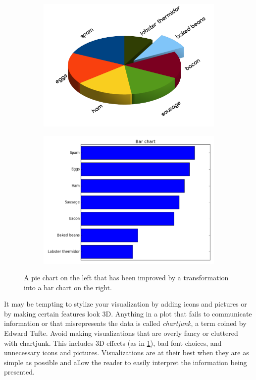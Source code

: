 \begin{figure} %
\centering
\begin{subfigure}{.45\textwidth}
\centering
\includegraphics[width=\textwidth]{bad_pie_chart.png}
\end{subfigure}
\begin{subfigure}{.45\textwidth}
\centering
\includegraphics[width=\textwidth]{bar_chart_horizontal_sorted.png}
\end{subfigure}
\caption{A pie chart on the left that has been improved by a transformation into a bar chart on the right.}
\label{fig:pievsbar}
\end{figure}

It may be tempting to stylize your visualization by adding icons and pictures or by making certain features look 3D.
Anything in a plot that fails to communicate information or that misrepresents the data is called \emph{chartjunk}, a term coined by Edward Tufte.
Avoid making visualizations that are overly fancy or cluttered with chartjunk. This includes 3D effects (as in \ref{fig:pievsbar}), bad font choices, and unnecessary icons and pictures.
Visualizations are at their best when they are as simple as possible and allow the reader to easily
interpret the information being presented.

